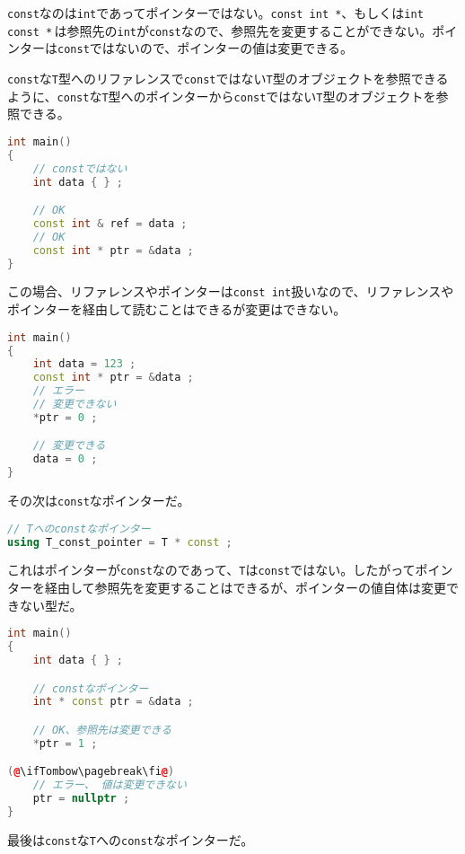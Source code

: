 \texttt{const}なのは\texttt{int}であってポインターではない。\texttt{const int *}、もしくは\texttt{int const *}\,は参照先の\texttt{int}が\texttt{const}なので、参照先を変更することができない。ポインターは\texttt{const}ではないので、ポインターの値は変更できる。

\texttt{const}な\texttt{T}型へのリファレンスで\texttt{const}ではない\texttt{T}型のオブジェクトを参照できるように、\texttt{const}な\texttt{T}型へのポインターから\texttt{const}ではない\texttt{T}型のオブジェクトを参照できる。

\ifTombow\pagebreak\fi
\begin{lstlisting}[language={C++}]
int main()
{
    // constではない
    int data { } ;

    // OK
    const int & ref = data ;
    // OK
    const int * ptr = &data ;
}
\end{lstlisting}

この場合、リファレンスやポインターは\texttt{const int}扱いなので、リファレンスやポインターを経由して読むことはできるが変更はできない。

\begin{lstlisting}[language={C++}]
int main()
{
    int data = 123 ;
    const int * ptr = &data ;
    // エラー
    // 変更できない
    *ptr = 0 ;

    // 変更できる
    data = 0 ;
}
\end{lstlisting}

その次は\texttt{const}なポインターだ。

\begin{lstlisting}[language={C++}]
// Tへのconstなポインター
using T_const_pointer = T * const ;
\end{lstlisting}

これはポインターが\texttt{const}なのであって、\texttt{T}は\texttt{const}ではない。したがってポインターを経由して参照先を変更することはできるが、ポインターの値自体は変更できない型だ。

\begin{lstlisting}[language={C++}]
int main()
{
    int data { } ;

    // constなポインター
    int * const ptr = &data ;

    // OK、参照先は変更できる
    *ptr = 1 ;

(@\ifTombow\pagebreak\fi@)
    // エラー、 値は変更できない
    ptr = nullptr ;
}
\end{lstlisting}

最後は\texttt{const}な\texttt{T}への\texttt{const}なポインターだ。

